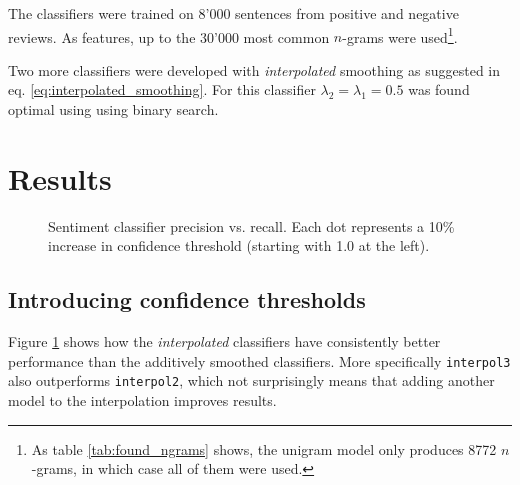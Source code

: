\documentclass[a4paper,11pt]{kth-mag}
\newcommand{\ngram}{$n$-gram}
\begin{document}
The classifiers were trained on 8'000 sentences from positive and negative reviews.
As features, up to the 30'000 most common \ngram s were used\footnote{As table
\ref{tab:found_ngrams} shows, the unigram model only produces 8772 \ngram s,
in which case all of them were used.}.


Two more classifiers were developed with \emph{interpolated} smoothing as suggested in eq.
\ref{eq:interpolated_smoothing}. For this classifier $\lambda_2=\lambda_1=0.5$ was found optimal using
using binary search. %



\newpage
\section{Results}

\begin{figure}[h]
  \centering
  \caption{Sentiment classifier precision vs. recall. Each dot represents a
    10\% increase in confidence threshold (starting with 1.0 at the left).}
  \label{fig:sent_pr_curve} 
\end{figure}


\subsection{Introducing confidence thresholds}
Figure \ref{fig:sent_pr_curve} shows how the \emph{interpolated} classifiers have
consistently better performance than the additively smoothed classifiers.
More specifically \texttt{interpol3} also outperforms \texttt{interpol2}, which
not surprisingly means that adding another model to the interpolation improves results.
\end{document}
